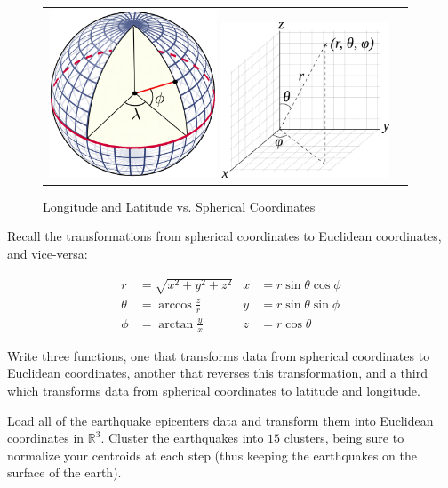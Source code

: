 \begin{figure}[h]
	\begin{tabular}{cc}
		\includegraphics[width=5cm]{latlong.png}
		\includegraphics[width=5cm]{spherical.png}
	\end{tabular}
	\caption{Longitude and Latitude vs. Spherical Coordinates}
\end{figure}

Recall the transformations from spherical coordinates to Euclidean coordinates, and vice-versa:

\begin{align*}
r & = \sqrt{x^{2} + y^{2} + z^{2}} & x & = r \sin \theta \cos \phi \\
\theta & = \arccos \frac{z}{r} & y & = r \sin \theta \sin \phi \\
\phi & = \arctan \frac{y}{x} & z & = r \cos \theta
\end{align*}

\begin{problem}
Write three functions, one that transforms data from spherical coordinates to Euclidean coordinates, another that reverses this transformation, and a third which transforms data from spherical coordinates to latitude and longitude.
\end{problem}

\begin{problem}
Load all of the earthquake epicenters data and transform them into Euclidean coordinates in $\mathbb{R}^{3}$. Cluster the earthquakes into $15$ clusters, being sure to normalize your centroids at each step (thus keeping the earthquakes on the surface of the earth).
\end{problem}

